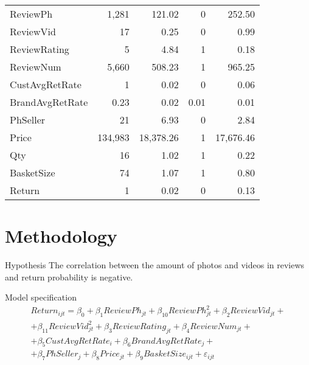 \documentclass[xcolor=dvipsnames,envcountsect]{beamer}
\begin{document}
\begin{frame}
\begin{table}[!htbp]
\begin{tabular}{@{\extracolsep{5pt}}lD{.}{.}{-2} D{.}{.}{-2} D{.}{.}{-2} D{.}{.}{-2} }
ReviewPh & 1,281 & 121.02 & 0 & 252.50 \\ 
ReviewVid & 17 & 0.25 & 0 & 0.99 \\ 
ReviewRating & 5 & 4.84 & 1 & 0.18 \\ 
ReviewNum & 5,660 & 508.23 & 1 & 965.25 \\ 
CustAvgRetRate & 1 & 0.02 & 0 & 0.06 \\ 
BrandAvgRetRate & 0.23 & 0.02 & 0.01 & 0.01 \\ 
PhSeller & 21 & 6.93 & 0 & 2.84 \\ 
Price & 134,983 & 18,378.26 & 1 & 17,676.46 \\ 
Qty & 16 & 1.02 & 1 & 0.22 \\ 
BasketSize & 74 & 1.07 & 1 & 0.80 \\ 
Return & 1 & 0.02 & 0 & 0.13 \\
\hline
\hline
\end{tabular} 
\end{table}


\endgroup
\end{frame}

\section{Methodology}
\begin{frame}{Hypothesis}
		\justifying
		The correlation between the amount of photos and videos in reviews and return probability is negative.
\end{frame}

\begin{frame}{Model specification}
		\begin{multline*}
            Return_{ijt} = \beta_0 + \beta_1ReviewPh_{jt} + \beta_{10}ReviewPh^2_{jt}+ \beta_2 ReviewVid_{jt}+\\+\beta_{11} ReviewVid^2_{jt}+\beta_{3}ReviewRating_{jt}+\beta_{4}ReviewNum_{jt}+\\
            +\beta_{5}CustAvgRetRate_{i}+\beta_{6}BrandAvgRetRate_{j}+
            \\+\beta_{7}PhSeller_{j}+\beta_{8}Price_{jt}+\beta_{9}BasketSize_{ijt}+\varepsilon_{ijt}
        \end{multline*}
\end{frame}

\end{document}
